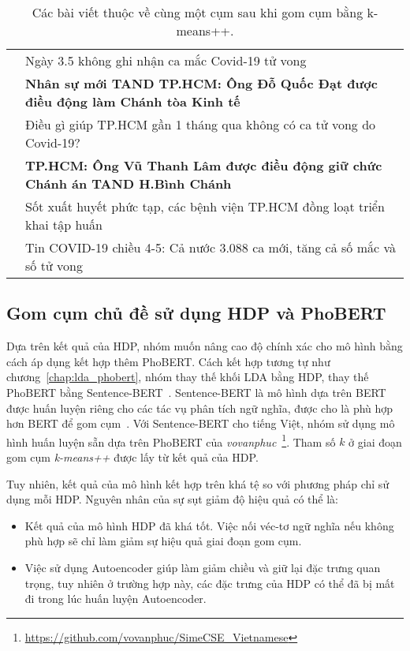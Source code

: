 \begin{table}[ht!]
\begin{tabular}{|c|l|}
                                   & Ngày 3.5 không ghi nhận ca mắc Covid-19 tử vong                                    \\
                                   & \textbf{Nhân sự mới TAND TP.HCM: Ông Đỗ Quốc Đạt được điều động làm Chánh tòa Kinh tế}      \\
                                   & Điều gì giúp TP.HCM gần 1 tháng qua không có ca tử vong do Covid-19?               \\
                                   & \textbf{TP.HCM: Ông Vũ Thanh Lâm được điều động giữ chức Chánh án TAND H.Bình Chánh}        \\
                                   & Sốt xuất huyết phức tạp, các bệnh viện TP.HCM đồng loạt triển khai tập huấn        \\
                                   & Tin COVID-19 chiều 4-5: Cả nước 3.088 ca mới, tăng cả số mắc và số tử vong         \\ \hline
\end{tabular}
    \caption{Các bài viết thuộc về cùng một cụm sau khi gom cụm bằng k-means++.}
    \label{table:articles-per-cluster}
\end{table}

\subsection{Gom cụm chủ đề sử dụng HDP và PhoBERT}
Dựa trên kết quả của \acrshort{HDP}, nhóm muốn nâng cao độ chính xác cho mô hình bằng cách áp dụng kết hợp thêm PhoBERT. Cách kết hợp tương tự như chương~\ref{chap:lda_phobert}, nhóm thay thế khối LDA bằng HDP, thay thế PhoBERT bằng Sentence-BERT~\cite{reimersSentenceBERTSentenceEmbeddings2019}. Sentence-BERT là mô hình dựa trên BERT được huấn luyện riêng cho các tác vụ phân tích ngữ nghĩa, được cho là phù hợp hơn BERT để gom cụm~\cite{reimersSentenceBERTSentenceEmbeddings2019}. Với Sentence-BERT cho tiếng Việt, nhóm sử dụng mô hình huấn luyện sẵn dựa trên PhoBERT của \textit{vovanphuc}~\footnote{\url{https://github.com/vovanphuc/SimeCSE_Vietnamese}}. Tham số $k$ ở giai đoạn gom cụm \textit{k-means++} được lấy từ kết quả của \acrshort{HDP}.

Tuy nhiên, kết quả của mô hình kết hợp trên khá tệ so với phương pháp chỉ sử dụng mỗi HDP. Nguyên nhân của sự sụt giảm độ hiệu quả có thể là:
\begin{itemize}
    \item Kết quả của mô hình \acrshort{HDP} đã khá tốt. Việc nối véc-tơ ngữ nghĩa nếu không phù hợp sẽ chỉ làm giảm sự hiệu quả giai đoạn gom cụm.
    \item Việc sử dụng Autoencoder giúp làm giảm chiều và giữ lại đặc trưng quan trọng, tuy nhiên ở trường hợp này, các đặc trưng của HDP có thể đã bị mất đi trong lúc huấn luyện Autoencoder.
\end{itemize}

